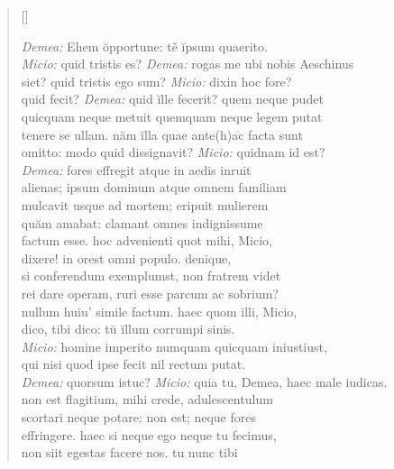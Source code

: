 


\settowidth{\versewidth}{aliquid. vah quemquamne hominem in animo instituere aut}
\begin{verse}[\versewidth]

\textit{Demea:} Ehem ŏpportune: tě ĭpsum quaerito.\\
    \textit{Micio:} quid tristis es? \textit{Demea:} rogas me ubi nobis Aeschinus\\
    siet? quid tristis ego sum? \textit{Micio:} dixin hoc fore?\\
    quid fecit? \textit{Demea:} quid ĭlle fecerit? quem neque pudet\\
    quicquam neque metuit quemquam neque legem putat\\
    tenere se ullam. năm ĭlla quae ante(h)ac facta sunt\\
    omitto: modo quid dissignavit? \textit{Micio:} quidnam id est?\\
    \textit{Demea:} fores effregit atque in aedis inruit\\
    alienas; ipsum dominum atque omnem familiam\\
    mulcavit usque ad mortem; eripuit mulierem\\
    quăm amabat: clamant omnes indignissume\\
    factum esse. hoc advenienti quot mihi, Micio,\\
    dixere! in orest omni populo. denique,\\
    si conferendum exemplumst, non fratrem videt\\
    rei dare operam, ruri esse parcum ac sobrium?\\
    nullum huiu' simile factum. haec quom illi, Micio,\\
    dico, tibi dico: tŭ ĭllum corrumpi sinis.\\
    \textit{Micio:} homine imperito numquam quicquam iniustiust,\\
    qui nisi quod ipse fecit nil rectum putat.\\
     \textit{Demea:} quorsum istuc? \textit{Micio:} quia tu, Demea, haec male iudicas.\\
    non est flagitium, mihi crede, adulescentulum\\
    scortari neque potare: non est; neque fores\\
    effringere. haec si neque ego neque tu fecimus,\\
    non siit egestas facere nos. tu nunc tibi\\

\end{verse}
